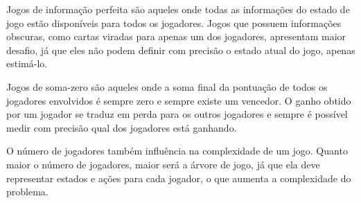 Jogos de informação perfeita são aqueles onde todas as informações do estado de jogo estão disponíveis para todos os jogadores. Jogos que possuem informações obscuras, como cartas viradas para apenas um dos jogadores, apresentam maior desafio, já que eles não podem definir com precisão o estado atual do jogo, apenas estimá-lo.

Jogos de soma-zero são aqueles onde a soma final da pontuação de todos os jogadores envolvidos é sempre zero e sempre existe um vencedor. O ganho obtido por um jogador se traduz em perda para os outros jogadores e sempre é possível medir com precisão qual dos jogadores está ganhando.

O número de jogadores também influência na complexidade de um jogo. Quanto maior o número de jogadores, maior será a árvore de jogo, já que ela deve representar estados e ações para cada jogador, o que aumenta a complexidade do problema.





